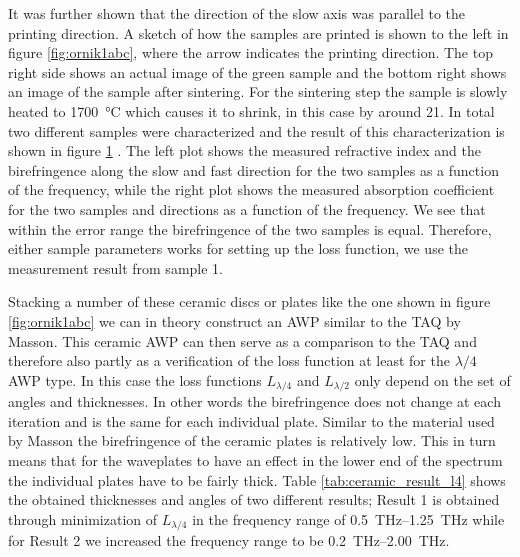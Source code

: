 It was further shown that the direction of the slow axis was parallel to the printing direction. A sketch of how the samples are printed is shown to the left in figure \ref{fig:ornik1abc}, where the arrow indicates the printing direction. The top right side shows an actual image of the green sample and the bottom right shows an image of the sample after sintering. For the sintering step the sample is slowly heated to \SI{1700}{\celsius} which causes it to shrink, in this case by around \SI{21}{\volpercent}. In total two different samples were characterized and the result of this characterization is shown in figure \ref{fig:ri_abs} \cite{Ornik2021}. The left plot shows the measured refractive index and the birefringence along the slow and fast direction for the two samples as a function of the frequency, while the right plot shows the measured absorption coefficient for the two samples and directions as a function of the frequency. We see that within the error range the birefringence of the two samples is equal. Therefore, either sample parameters works for setting up the loss function, we use the measurement result from sample 1. 

\begin{figure}[h]
    \centering
    
    \caption{}
    \label{fig:ri_abs}
\end{figure}

Stacking a number of these ceramic discs or plates like the one shown in figure \ref{fig:ornik1abc} we can in theory construct an AWP similar to the TAQ by Masson. This ceramic AWP can then serve as a comparison to the TAQ and therefore also partly as a verification of the loss function at least for the $\lambda/4$ AWP type. In this case the loss functions $L_{\lambda/4}$ and $L_{\lambda/2}$ only depend on the set of angles and thicknesses. In other words the birefringence does not change at each iteration and is the same for each individual plate. Similar to the material used by Masson the birefringence of the ceramic plates is relatively low. This in turn means that for the waveplates to have an effect in the lower end of the spectrum the individual plates have to be fairly thick. Table \ref{tab:ceramic_result_l4} shows the obtained thicknesses and angles of two different results; Result 1 is obtained through minimization of $L_{\lambda/4}$ in the frequency range of \SIrange{0.5}{1.25}{\tera \hertz} while for Result 2 we increased the frequency range to be \SIrange{0.2}{2.00}{\tera \hertz}. 

